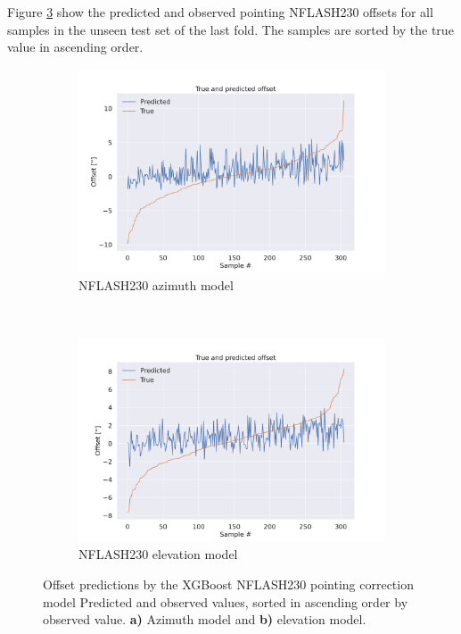 Figure \ref{fig:sortpred_selected_result_xgb} show the predicted and observed pointing NFLASH230 offsets for all samples in the unseen test set of the last fold.
The samples are sorted by the true value in ascending order.


\begin{figure}[H]
    \centering
    \begin{subfigure}[t]{\textwidth}
        \centering
        \includegraphics[width=\textwidth]{Results/sortpred_XGB_ds2_tp5_k30_uncorr_az_test.pdf}
        \caption{NFLASH230 azimuth model}
        \label{subfig:sortpred_lastfold_nflash230_az}
    \end{subfigure}
    \\
    \begin{subfigure}[t]{\textwidth}
       \centering
       \includegraphics[width=1\textwidth]{Results/sortpred_XGB_ds2_tp5_k40_uncorr_el_test.pdf}
       \caption{NFLASH230 elevation model}
       \label{subfig:sortpred_lastfold_nflash230_el}
    \end{subfigure}
    \caption{Offset predictions by the XGBoost NFLASH230 pointing correction model
     Predicted and observed values, sorted in ascending order by observed value. \textbf{a)} Azimuth model and \textbf{b)} elevation model.}
    \label{fig:sortpred_selected_result_xgb}
\end{figure}



